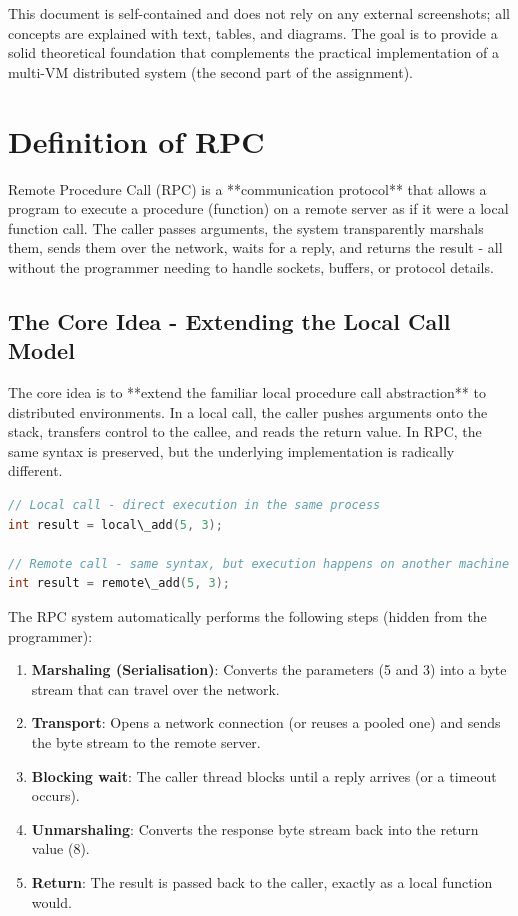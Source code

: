 \documentclass[a4paper]{article}
\begin{document}
This document is self-contained and does not rely on any external screenshots; all concepts are explained with text, tables, and diagrams. The goal is to provide a solid theoretical foundation that complements the practical implementation of a multi-VM distributed system (the second part of the assignment).

\section{Definition of RPC}
Remote Procedure Call (RPC) is a **communication protocol** that allows a program to execute a procedure (function) on a remote server as if it were a local function call. The caller passes arguments, the system transparently marshals them, sends them over the network, waits for a reply, and returns the result - all without the programmer needing to handle sockets, buffers, or protocol details.

\subsection{The Core Idea - Extending the Local Call Model}
The core idea is to **extend the familiar local procedure call abstraction** to distributed environments. In a local call, the caller pushes arguments onto the stack, transfers control to the callee, and reads the return value. In RPC, the same syntax is preserved, but the underlying implementation is radically different.

\begin{lstlisting}[language=C]
// Local call - direct execution in the same process
int result = local\_add(5, 3);

// Remote call - same syntax, but execution happens on another machine
int result = remote\_add(5, 3);
\end{lstlisting}

The RPC system automatically performs the following steps (hidden from the programmer):
\begin{enumerate}
    \item \textbf{Marshaling (Serialisation)}: Converts the parameters (5 and 3) into a byte stream that can travel over the network.
    \item \textbf{Transport}: Opens a network connection (or reuses a pooled one) and sends the byte stream to the remote server.
    \item \textbf{Blocking wait}: The caller thread blocks until a reply arrives (or a timeout occurs).
    \item \textbf{Unmarshaling}: Converts the response byte stream back into the return value (8).
    \item \textbf{Return}: The result is passed back to the caller, exactly as a local function would.
\end{enumerate}
\end{document}
